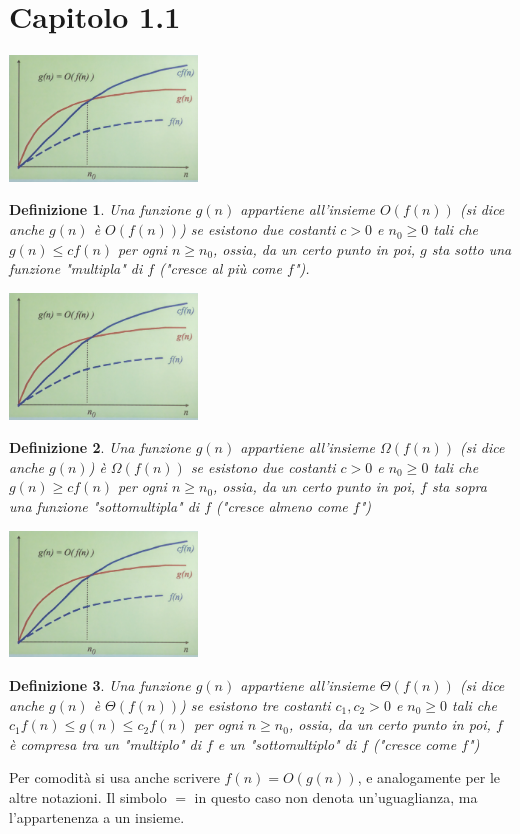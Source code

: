 \documentclass[12pt]{article}
\newtheorem{definition}{Definizione}
\begin{document}
\section{Capitolo 1.1}
\includegraphics[width=5cm]{bigograph.jpeg}
\begin{definition}
    Una funzione \(g(n)\) appartiene all'insieme \(O(f(n))\) (si dice anche \(g(n)\) è \(O(f(n))\)) se esistono due costanti \(c > 0\) e \(n_{0} \geq 0\) tali che \(g(n) \leq cf(n)\) per ogni \(n \geq n_{0}\), ossia, da un certo punto in poi, \(g\) sta sotto una funzione "multipla" di \(f\) ("cresce al più come \(f\)").
\end{definition}
\includegraphics[width=5cm]{bigograph.jpeg}
\begin{definition}
    Una funzione \(g(n)\) appartiene all'insieme \(\Omega(f(n))\) (si dice anche \(g(n)\)) è \(\Omega(f(n))\) se esistono due costanti \(c > 0\) e \(n_{0} \geq 0\) tali che \(g(n) \geq cf(n)\) per ogni \(n \geq n_{0}\), ossia, da un certo punto in poi, \(f\) sta sopra una funzione "sottomultipla" di \(f\) ("cresce almeno come \(f\)")
\end{definition}
\includegraphics[width=5cm]{bigograph.jpeg}
\begin{definition}
    Una funzione \(g(n)\) appartiene all'insieme \(\Theta(f(n))\) (si dice anche \(g(n)\) è \(\Theta(f(n))\)) se esistono tre costanti \(c_{1},c_{2} > 0\) e \(n_{0} \geq 0\) tali che \(c_{1}f(n) \leq g(n) \leq c_{2}f(n)\) per ogni \(n \geq n_{0}\), ossia, da un certo punto in poi, \(f\) è compresa tra un "multiplo" di \(f\) e un "sottomultiplo" di \(f\) ("cresce come \(f\)")
\end{definition}
Per comodità si usa anche scrivere \(f(n) = O(g(n))\), e analogamente per le altre notazioni. Il simbolo \(=\) in questo caso non denota un'uguaglianza, ma l'appartenenza a un insieme.
\end{document}
